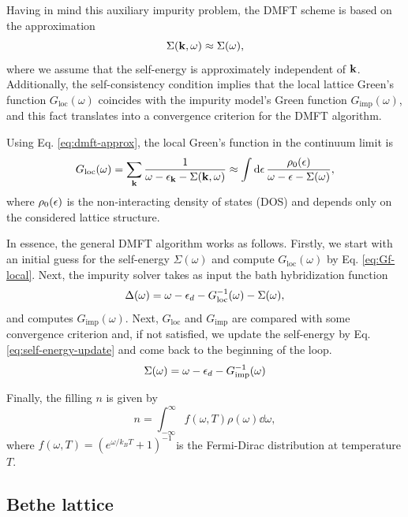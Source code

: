 \documentclass[12pt]{report}
\begin{document}
Having in mind this auxiliary impurity problem, the DMFT scheme is based on the approximation
\begin{equation} \label{eq:dmft-approx}
\Sigma({\vb{k}}, \omega) \approx \Sigma(\omega),
\end{equation}
where we assume that the self-energy is approximately independent of ${\vb{k}}$. Additionally, the self-consistency condition implies that the local lattice Green's function $G_{\text{loc}}(\omega)$ coincides with the impurity model's Green function $G_{\text{imp}}(\omega)$, and this fact translates into a convergence criterion for the DMFT algorithm.

Using Eq. \eqref{eq:dmft-approx}, the local Green's function in the continuum limit is
\begin{equation} \label{eq:Gf-local}
G_{\text{loc}}(\omega) = \sum_{{\vb{k}}} \frac{1}{\omega-\epsilon_{\vb{k}}-\Sigma({\vb{k}}, \omega)} \approx
\int \dd{\epsilon} \frac{\rho_0(\epsilon)}{\omega - \epsilon - \Sigma(\omega)},
\end{equation}
where $\rho_0(\epsilon)$ is the non-interacting density of states (DOS) and depends only on the considered lattice structure.

In essence, the general DMFT algorithm works as follows. Firstly, we start with an initial guess for the self-energy $\Sigma(\omega)$ and compute $G_{\text{loc}}(\omega)$ by Eq. \eqref{eq:Gf-local}. Next, the impurity solver takes as input the bath hybridization function
\begin{equation} \label{eq:hybridization-func}
\Delta(\omega) = \omega - \epsilon_d - G_{\text{loc}}^{-1}(\omega) - \Sigma(\omega),
\end{equation}
and computes $G_{\text{imp}}(\omega)$. Next, $G_{\text{loc}}$ and $G_{\text{imp}}$ are compared with some convergence criterion and, if not satisfied, we update the self-energy by Eq. \eqref{eq:self-energy-update} and come back to the beginning of the loop.
\begin{equation} \label{eq:self-energy-update}
\Sigma(\omega) = \omega - \epsilon_d - G_{\text{imp}}^{-1}(\omega)
\end{equation}

Finally, the filling $n$ is given by \cite{bruus}
\begin{equation} \label{eq:filling}
n = \int_{-\infty}^{\infty} f(\omega, T) \rho(\omega) \dd{\omega},
\end{equation}
where $f(\omega, T) = (e^{\omega/k_B T} + 1)^{-1}$ is the Fermi-Dirac distribution at temperature $T$.

\subsection{Bethe lattice} \label{sec:bethe}
\end{document}
